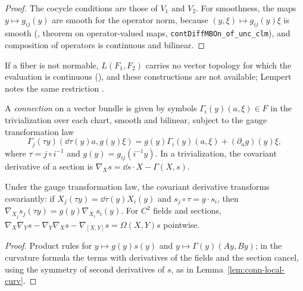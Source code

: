 \begin{proof}
  \leanok
  The cocycle conditions are those of $V_1$ and $V_2$. For smoothness, the maps
  $y \mapsto g_{ij}(y)$ are smooth for the operator norm, because $(y, \xi) \mapsto g_{ij}(y)\xi$
  is smooth (\cite{LCA}, theorem on operator-valued maps, \texttt{contDiffMBOn\_of\_unc\_clm}),
  and composition of operators is continuous and bilinear.
\end{proof}

If a fiber is not normable, $L(F_1, F_2)$ carries no vector topology for which the evaluation is
continuous (\cite[Satz 1 and its footnote]{Mai63}), and these constructions are not available;
Lempert notes the same restriction
\cite[\S2, p.~488]{Lem98}.

\begin{definition}
  \label{def:bundle-connection}
  \leanok
  A \emph{connection} on a vector bundle is given by symbols $\Gamma_i(y)(a, \xi) \in F$ in the
  trivialization over each chart, smooth and bilinear, subject to the gauge transformation law
  \[
    \Gamma_j(\tau y)(\dd\tau(y) a, g(y)\xi) = g(y)\Gamma_i(y)(a, \xi) + (\partial_a g)(y)\xi,
  \]
  where $\tau = j \circ i^{-1}$ and $g(y) = g_{ij}(i^{-1} y)$. In a trivialization, the covariant
  derivative of a section is $\nabla_X s = \dd s \cdot X - \Gamma(X, s)$.
\end{definition}

\begin{lemma}
  \label{lem:bundle-cov-deriv}
  \leanok
  Under the gauge transformation law, the covariant derivative transforms covariantly:
  if $X_j(\tau y) = \dd\tau(y) X_i(y)$ and $s_j \circ \tau = g \cdot s_i$, then
  $\nabla_{X_j} s_j(\tau y) = g(y) \nabla_{X_i} s_i(y)$. For $C^2$ fields and sections,
  $\nabla_X\nabla_Y s - \nabla_Y\nabla_X s - \nabla_{[X, Y]} s = \Omega(X, Y) s$ pointwise.
\end{lemma}

\begin{proof}
  \leanok
  Product rules for $y \mapsto g(y)s(y)$ and $y \mapsto \Gamma(y)(A y, B y)$; in the curvature
  formula the terms with derivatives of the fields and the section cancel, using the symmetry of
  second derivatives of $s$, as in Lemma~\ref{lem:conn-local-curv}.
\end{proof}

